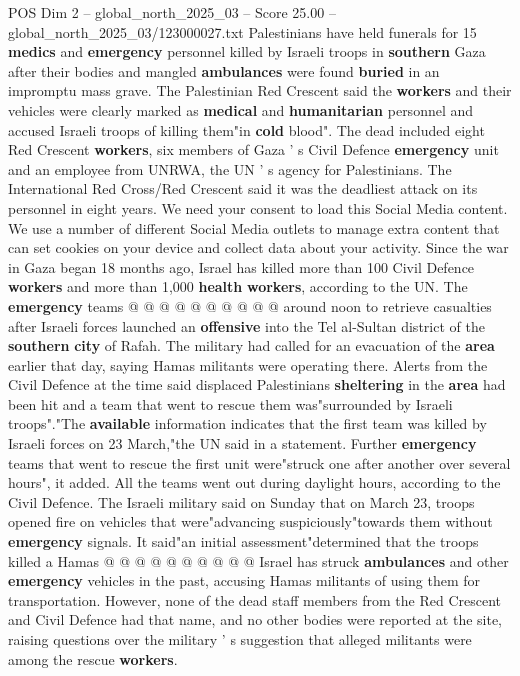 \begin{textsample}{POS Dim 2 – global\_north\_2025\_03 – Score 25.00 – global\_north\_2025\_03/123000027.txt}  \label{ex:f2_pos_408}
Palestinians have held funerals for 15 \textbf{medics} and \textbf{emergency} personnel killed by Israeli troops in \textbf{southern} Gaza after their bodies and mangled \textbf{ambulances} were found \textbf{buried} in an impromptu mass grave.
The Palestinian Red Crescent said the \textbf{workers} and their vehicles were clearly marked as \textbf{medical} and \textbf{humanitarian} personnel and accused Israeli troops of killing them"in \textbf{cold} blood".
The dead included eight Red Crescent \textbf{workers}, six members of Gaza ' s Civil Defence \textbf{emergency} unit and an employee from UNRWA, the UN ' s agency for Palestinians.
The International Red Cross/Red Crescent said it was the deadliest attack on its personnel in eight years.
We need your consent to load this Social Media content.
We use a number of different Social Media outlets to manage extra content that can set cookies on your device and collect data about your activity.
Since the war in Gaza began 18 months ago, Israel has killed more than 100 Civil Defence \textbf{workers} and more than 1,000 \textbf{health} \textbf{workers}, according to the UN.
The \textbf{emergency} teams @ @ @ @ @ @ @ @ @ @ around noon to retrieve casualties after Israeli forces launched an \textbf{offensive} into the Tel al-Sultan district of the \textbf{southern} \textbf{city} of Rafah.
The military had called for an evacuation of the \textbf{area} earlier that day, saying Hamas militants were operating there.
Alerts from the Civil Defence at the time said displaced Palestinians \textbf{sheltering} in the \textbf{area} had been hit and a team that went to rescue them was"surrounded by Israeli troops"."The \textbf{available} information indicates that the first team was killed by Israeli forces on 23 March,"the UN said in a statement.
Further \textbf{emergency} teams that went to rescue the first unit were"struck one after another over several hours", it added.
All the teams went out during daylight hours, according to the Civil Defence.
The Israeli military said on Sunday that on March 23, troops opened fire on vehicles that were"advancing suspiciously"towards them without \textbf{emergency} signals.
It said"an initial assessment"determined that the troops killed a Hamas @ @ @ @ @ @ @ @ @ @ Israel has struck \textbf{ambulances} and other \textbf{emergency} vehicles in the past, accusing Hamas militants of using them for transportation.
However, none of the dead staff members from the Red Crescent and Civil Defence had that name, and no other bodies were reported at the site, raising questions over the military ' s suggestion that alleged militants were among the rescue \textbf{workers}.

\end{textsample}
